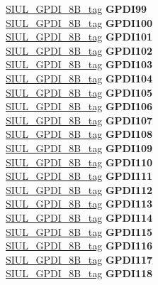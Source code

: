 \begin{DoxyCompactItemize}
\begin{tabbing}
\>\>\mbox{\hyperlink{unionSIUL__GPDI__8B__tag}{SIUL\_GPDI\_8B\_tag}} {\bfseries GPDI99}\\
\>\>\mbox{\hyperlink{unionSIUL__GPDI__8B__tag}{SIUL\_GPDI\_8B\_tag}} {\bfseries GPDI100}\\
\>\>\mbox{\hyperlink{unionSIUL__GPDI__8B__tag}{SIUL\_GPDI\_8B\_tag}} {\bfseries GPDI101}\\
\>\>\mbox{\hyperlink{unionSIUL__GPDI__8B__tag}{SIUL\_GPDI\_8B\_tag}} {\bfseries GPDI102}\\
\>\>\mbox{\hyperlink{unionSIUL__GPDI__8B__tag}{SIUL\_GPDI\_8B\_tag}} {\bfseries GPDI103}\\
\>\>\mbox{\hyperlink{unionSIUL__GPDI__8B__tag}{SIUL\_GPDI\_8B\_tag}} {\bfseries GPDI104}\\
\>\>\mbox{\hyperlink{unionSIUL__GPDI__8B__tag}{SIUL\_GPDI\_8B\_tag}} {\bfseries GPDI105}\\
\>\>\mbox{\hyperlink{unionSIUL__GPDI__8B__tag}{SIUL\_GPDI\_8B\_tag}} {\bfseries GPDI106}\\
\>\>\mbox{\hyperlink{unionSIUL__GPDI__8B__tag}{SIUL\_GPDI\_8B\_tag}} {\bfseries GPDI107}\\
\>\>\mbox{\hyperlink{unionSIUL__GPDI__8B__tag}{SIUL\_GPDI\_8B\_tag}} {\bfseries GPDI108}\\
\>\>\mbox{\hyperlink{unionSIUL__GPDI__8B__tag}{SIUL\_GPDI\_8B\_tag}} {\bfseries GPDI109}\\
\>\>\mbox{\hyperlink{unionSIUL__GPDI__8B__tag}{SIUL\_GPDI\_8B\_tag}} {\bfseries GPDI110}\\
\>\>\mbox{\hyperlink{unionSIUL__GPDI__8B__tag}{SIUL\_GPDI\_8B\_tag}} {\bfseries GPDI111}\\
\>\>\mbox{\hyperlink{unionSIUL__GPDI__8B__tag}{SIUL\_GPDI\_8B\_tag}} {\bfseries GPDI112}\\
\>\>\mbox{\hyperlink{unionSIUL__GPDI__8B__tag}{SIUL\_GPDI\_8B\_tag}} {\bfseries GPDI113}\\
\>\>\mbox{\hyperlink{unionSIUL__GPDI__8B__tag}{SIUL\_GPDI\_8B\_tag}} {\bfseries GPDI114}\\
\>\>\mbox{\hyperlink{unionSIUL__GPDI__8B__tag}{SIUL\_GPDI\_8B\_tag}} {\bfseries GPDI115}\\
\>\>\mbox{\hyperlink{unionSIUL__GPDI__8B__tag}{SIUL\_GPDI\_8B\_tag}} {\bfseries GPDI116}\\
\>\>\mbox{\hyperlink{unionSIUL__GPDI__8B__tag}{SIUL\_GPDI\_8B\_tag}} {\bfseries GPDI117}\\
\>\>\mbox{\hyperlink{unionSIUL__GPDI__8B__tag}{SIUL\_GPDI\_8B\_tag}} {\bfseries GPDI118}\\

\end{tabbing}
\end{DoxyCompactItemize}
